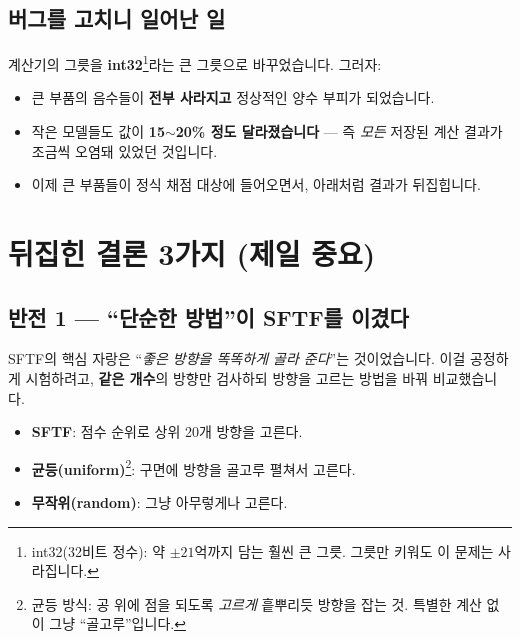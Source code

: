 \documentclass[11pt,a4paper]{article}
\begin{document}
\subsection{버그를 고치니 일어난 일}

계산기의 그릇을 \textbf{int32}\footnote{int32(32비트 정수): 약 $\pm 21$억까지 담는
훨씬 큰 그릇. 그릇만 키워도 이 문제는 사라집니다.}라는 큰 그릇으로 바꾸었습니다.
그러자:
\begin{itemize}[leftmargin=1.4em]
  \item 큰 부품의 음수들이 \textbf{전부 사라지고} 정상적인 양수 부피가 되었습니다.
  \item 작은 모델들도 값이 \textbf{15$\sim$20\% 정도 달라졌습니다} — 즉 \emph{모든}
        저장된 계산 결과가 조금씩 오염돼 있었던 것입니다.
  \item 이제 큰 부품들이 정식 채점 대상에 들어오면서, 아래처럼 결과가 뒤집힙니다.
\end{itemize}

\section{뒤집힌 결론 3가지 (제일 중요)}

\subsection{반전 1 — ``단순한 방법''이 SFTF를 이겼다}

SFTF의 핵심 자랑은 ``\emph{좋은 방향을 똑똑하게 골라 준다}''는 것이었습니다. 이걸
공정하게 시험하려고, \textbf{같은 개수}의 방향만 검사하되 방향을 고르는 방법을 바꿔
비교했습니다.
\begin{itemize}[leftmargin=1.4em]
  \item \textbf{SFTF}: 점수 순위로 상위 20개 방향을 고른다.
  \item \textbf{균등(uniform)}\footnote{균등 방식: 공 위에 점을 되도록 \emph{고르게}
        흩뿌리듯 방향을 잡는 것. 특별한 계산 없이 그냥 ``골고루''입니다.}: 구면에
        방향을 골고루 펼쳐서 고른다.
  \item \textbf{무작위(random)}: 그냥 아무렇게나 고른다.
\end{itemize}
\end{document}
